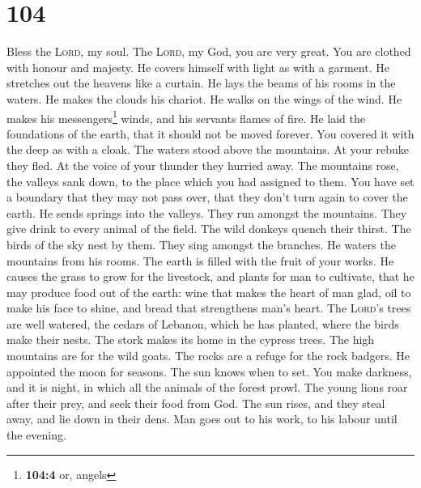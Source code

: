 \hypertarget{section-103}{%
\section{104}\label{section-103}}

 Bless the \textsc{Lord}, my soul. The \textsc{Lord}, my
God, you are very great. You are clothed with honour and majesty.
 He covers himself with light as with a garment. He
stretches out the heavens like a curtain.  He lays the
beams of his rooms in the waters. He makes the clouds his chariot. He
walks on the wings of the wind.  He makes his
messengers\footnote{\textbf{104:4} or, angels} winds, and his servants
flames of fire.  He laid the foundations of the earth,
that it should not be moved forever.  You covered it with
the deep as with a cloak. The waters stood above the mountains.
 At your rebuke they fled. At the voice of your thunder
they hurried away.  The mountains rose, the valleys sank
down, to the place which you had assigned to them.  You
have set a boundary that they may not pass over, that they don't turn
again to cover the earth.  He sends springs into the
valleys. They run amongst the mountains.  They give drink
to every animal of the field. The wild donkeys quench their thirst.
 The birds of the sky nest by them. They sing amongst the
branches.  He waters the mountains from his rooms. The
earth is filled with the fruit of your works.  He causes
the grass to grow for the livestock, and plants for man to cultivate,
that he may produce food out of the earth:  wine that
makes the heart of man glad, oil to make his face to shine, and bread
that strengthens man's heart.  The \textsc{Lord}'s trees
are well watered, the cedars of Lebanon, which he has planted,
 where the birds make their nests. The stork makes its
home in the cypress trees.  The high mountains are for
the wild goats. The rocks are a refuge for the rock badgers.
 He appointed the moon for seasons. The sun knows when to
set.  You make darkness, and it is night, in which all
the animals of the forest prowl.  The young lions roar
after their prey, and seek their food from God.  The sun
rises, and they steal away, and lie down in their dens. 
Man goes out to his work, to his labour until the evening.
